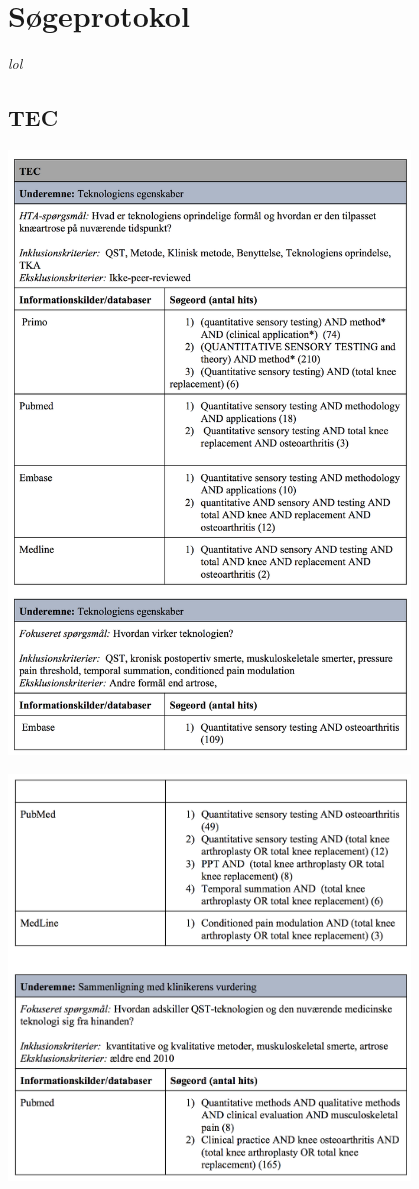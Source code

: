 \chapter{Søgeprotokol} \vspace{-.75cm}
\textit{lol}
\section{TEC}\label{TEC_sog}
\includegraphics[width=0.8\textwidth]{rapportAfsnit/qBilag/sogninger/TEC1}

\includegraphics[width=0.8\textwidth]{rapportAfsnit/qBilag/sogninger/TEC2}

